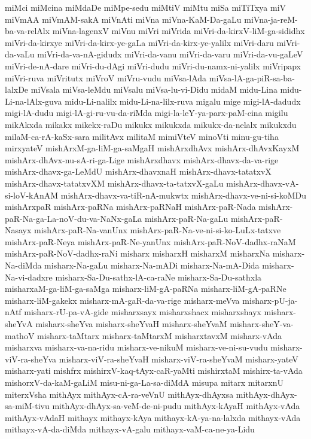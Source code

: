 {miMci
miMcina
miMdaDe
miMpe-sedu
miMtiV
miMtu
miSa
miTiTxya
miV
miVmAA
miVmAM-sakA
miVnAti
miVna
miVna-KaM-Da-gaLu
miVna-ja-reM-ba-va-relAlx
miVna-lagenxV
miVnu
miVri
miVrida
miVri-da-kirxV-liM-ga-sididhx
miVri-da-kirxye
miVri-da-kirx-ye-gaLa
miVri-da-kirx-ye-yalilx
miVri-daru
miVri-da-vaLu
miVri-da-va-nA-gidudx
miVri-da-vanu
miVri-da-varu
miVri-da-vu-gaLeV
miVri-de-nA-dare
miVri-du-dAgi
miVri-dudu
miVri-du-namx-ni-yalilx
miVripapx
miVri-ruva
miVritutx
miVroV
miVru-vudu
miVsa-lAda
miVsa-lA-ga-piR-sa-ba-lalxDe
miVsala
miVsa-leMdu
miVsalu
miVsa-lu-vi-Didu
midaM
midu-Lina
midu-Li-na-lAlx-guva
midu-Li-nalilx
midu-Li-na-lilx-ruva
migalu
mige
migi-lA-dadudx
migi-lA-dudu
migi-lA-gi-ru-vu-da-riMda
migi-la-leY-ya-parx-paM-cina
migilu
mikAkxda
mikakx
mikekx-raDu
mikukx
mikukxda
mikukx-da-nelalx
mikukxdu
milaM-ca-rA-kaSx-sara
militAvx
militaM
mimiVteV
minoVti
minu-gu-tiha
mirxyateV
mishArxM-ga-liM-ga-saMgaH
mishArxdhAvx
mishArx-dhAvxKayxM
mishArx-dhAvx-nu-sA-ri-ga-Lige
mishArxdhavx
mishArx-dhavx-da-va-rige
mishArx-dhavx-ga-LeMdU
mishArx-dhavxnaH
mishArx-dhavx-tatatxvX
mishArx-dhavx-tatatxvXM
mishArx-dhavx-ta-tatxvX-gaLu
mishArx-dhavx-vA-si-loV-kAnAM
mishArx-dhavx-va-tiR-nA-mukwtx
mishArx-dhavx-ve-ni-si-koMDu
mishArxpaR
mishArx-paRNa
mishArx-paRNaH
mishArx-paR-Nada
mishArx-paR-Na-ga-La-noV-du-va-NaNx-gaLa
mishArx-paR-Na-gaLu
mishArx-paR-Nasayx
mishArx-paR-Na-vanUnx
mishArx-paR-Na-ve-ni-si-ko-LuLx-tatxve
mishArx-paR-Neya
mishArx-paR-Ne-yanUnx
mishArx-paR-NoV-dadhx-raNaM
mishArx-paR-NoV-dadhx-raNi
misharx
misharxH
misharxM
misharxNa
misharx-Na-diMda
misharx-Na-gaLu
misharx-Na-mADi
misharx-Na-mA-Dida
misharx-Na-vi-dadxre
misharx-Sa-Du-sathx-lA-ca-raNe
misharx-Sa-Du-sathxla
misharxaM-ga-liM-ga-saMga
misharx-liM-gA-paRNa
misharx-liM-gA-paRNe
misharx-liM-gakekx
misharx-mA-gaR-da-va-rige
misharx-meVva
misharx-pU-ja-nAtf
misharx-rU-pa-vA-gide
misharxsayx
misharxshacx
misharxshayx
misharx-sheYvA
misharx-sheYva
misharx-sheYvaH
misharx-sheYvaM
misharx-sheY-va-mathoV
misharx-taMtarx
misharx-taMtarxM
misharxtavxM
misharx-vAda
misharxva
misharx-va-na-ridu
misharx-ve-nikuM
misharx-ve-ni-su-vudu
misharx-viV-ra-sheYva
misharx-viV-ra-sheYvaH
misharx-viV-ra-sheYvaM
misharx-yateV
misharx-yati
mishfrx
mishirxV-kaq-tAyx-caR-yaMti
mishirxtaM
mishirx-ta-vAda
mishorxV-da-kaM-gaLiM
misu-ni-ga-La-sa-diMdA
misupa
mitarx
mitarxnU
miterxVsha
mithAyx
mithAyx-cA-ra-veVnU
mithAyx-dhAyxsa
mithAyx-dhAyx-sa-miM-tivu
mithAyx-dhAyx-sa-veM-de-ni-pudu
mithAyx-kAyaH
mithAyx-vAda
mithAyx-vAdaH
mithayx
mithayx-kAya
mithayx-kA-ya-na-lalxda
mithayx-vAda
mithayx-vA-da-diMda
mithayx-vA-galu
mithayx-vaM-ca-ne-ya-Lidu
}
